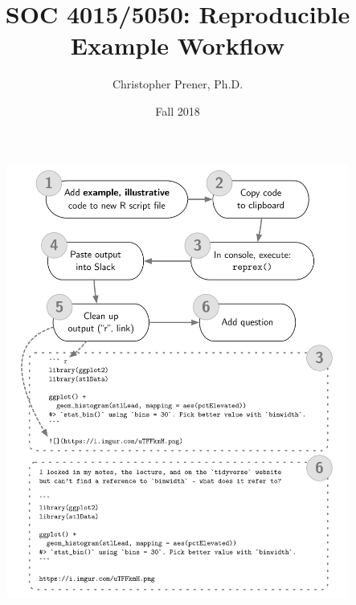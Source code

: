 \documentclass{tufte-handout}
\title{SOC 4015/5050: Reproducible Example Workflow}
\author{Christopher Prener, Ph.D.}
\date{Fall 2018}
\begin{document}
\maketitle %

\begin{fullwidth}
\begin{figure}[!h]
\includegraphics[scale=.70]{"reprex"}
\end{figure}
\end{fullwidth}

\end{document}
